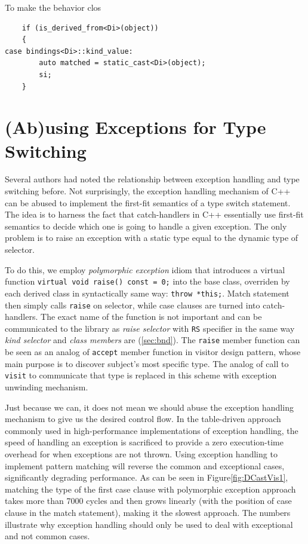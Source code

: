 \documentclass[preprint]{sigplanconf}
\makeatletter
\DeclareRobustCommand{\code}[1]{{\lstinline[breaklines=false,escapechar=@]{#1}}}
\makeatother
\begin{document}
To make the behavior clos

\begin{lstlisting}
    if (is_derived_from<Di>(object))
    {
case bindings<Di>::kind_value:
        auto matched = static_cast<Di>(object); 
        si;
    }
\end{lstlisting}


\section{(Ab)using Exceptions for Type Switching}
\label{sec:xpm}

Several authors had noted the relationship between exception handling and type 
switching before\cite{Glew99,ML2000}. Not surprisingly, the exception handling 
mechanism of C++ can be abused to implement the first-fit semantics of a type 
switch statement. The idea is to harness the fact that catch-handlers in C++ 
essentially use first-fit semantics to decide which one is going to handle a 
given exception. The only problem is to raise an exception with a static type 
equal to the dynamic type of selector.

To do this, we employ \emph{polymorphic exception} idiom\cite{PolyExcept} that 
introduces a virtual function \code{virtual void raise() const = 0;} into the 
base class, overriden by each derived class in syntactically same way: 
\code{throw *this;}. Match statement then simply calls \code{raise} on selector, 
while case clauses are turned into catch-handlers.
The exact name of the function is not important and can be communicated to the 
library as \emph{raise selector} with \code{RS} specifier in the same way 
\emph{kind selector} and \emph{class members} are (\textsection\ref{sec:bnd}). 
The \code{raise} member function can be seen as an analog of \code{accept} 
member function in visitor design pattern, whose main purpose is to discover 
subject's most specific type. The analog of call to \code{visit} to communicate 
that type is replaced in this scheme with exception unwinding mechanism.

Just because we can, it does not mean we should abuse the exception handling 
mechanism to give us the desired control flow. In the table-driven approach 
commonly used in high-performance implementations of exception handling, the 
speed of handling an exception is sacrificed to provide a zero execution-time 
overhead for when exceptions are not thrown\cite{Schilling98}. Using exception 
handling to implement pattern matching will reverse the common and exceptional 
cases, significantly degrading performance. As can be seen in 
Figure\ref{fig:DCastVis1}, matching the type of the first case clause with 
polymorphic exception approach takes more than 7000 cycles and then grows 
linearly (with the position of case clause in the match statement), making it the 
slowest approach. The numbers illustrate why exception handling should only be 
used to deal with exceptional and not common cases.
\end{document}
